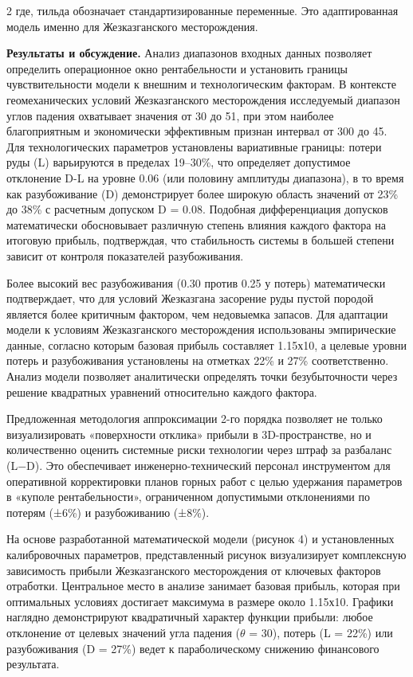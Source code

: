 \begin{multicols}{2}
где, тильда обозначает стандартизированные переменные. Это
адаптированная модель именно для Жезказганского месторождения.

{\bfseries Результаты и обсуждение.} Анализ диапазонов входных данных
позволяет определить операционное окно рентабельности и установить
границы чувствительности модели к внешним и технологическим факторам. В
контексте геомеханических условий Жезказганского месторождения
исследуемый диапазон углов падения охватывает значения от
30 до 51, при этом наиболее
благоприятным и экономически эффективным признан интервал от 300 до
45. Для технологических параметров установлены
вариативные границы: потери руды (L) варьируются в пределах 19--30\%,
что определяет допустимое отклонение D-L на уровне 0.06 (или половину
амплитуды диапазона), в то время как разубоживание (D) демонстрирует
более широкую область значений от 23\% до 38\% с расчетным допуском D =
0.08. Подобная дифференциация допусков математически обосновывает
различную степень влияния каждого фактора на итоговую прибыль,
подтверждая, что стабильность системы в большей степени зависит от
контроля показателей разубоживания.

Более высокий вес разубоживания (0.30 против 0.25 у потерь)
математически подтверждает, что для условий Жезказгана засорение руды
пустой породой является более критичным фактором, чем недовыемка
запасов. Для адаптации модели к условиям Жезказганского месторождения
использованы эмпирические данные, согласно которым базовая прибыль
составляет 1.15х10, а целевые уровни потерь и
разубоживания установлены на отметках 22\% и 27\% соответственно. Анализ
модели позволяет аналитически определять точки безубыточности через
решение квадратных уравнений относительно каждого фактора.

Предложенная методология аппроксимации 2-го порядка позволяет не только
визуализировать «поверхности отклика» прибыли в 3D-пространстве, но и
количественно оценить системные риски технологии через штраф за
разбаланс (L−D). Это обеспечивает инженерно-технический персонал
инструментом для оперативной корректировки планов горных работ с целью
удержания параметров в «куполе рентабельности», ограниченном допустимыми
отклонениями по потерям (±6\%) и разубоживанию (±8\%).

На основе разработанной математической модели (рисунок 4) и
установленных калибровочных параметров, представленный рисунок
визуализирует комплексную зависимость прибыли Жезказганского
месторождения от ключевых факторов отработки. Центральное место в
анализе занимает базовая прибыль, которая при оптимальных условиях
достигает максимума в размере около 1.15х10. Графики
наглядно демонстрируют квадратичный характер функции прибыли: любое
отклонение от целевых значений угла падения (\(\theta\) =
30), потерь (L = 22\%) или разубоживания (D = 27\%)
ведет к параболическому снижению финансового результата.
\end{multicols}

